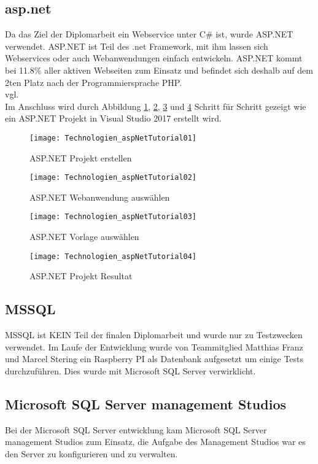 \subsection {asp.net}
\label{sec:asp.net}
Da das Ziel der Diplomarbeit ein Webservice unter C\# ist, wurde ASP.NET verwendet. ASP.NET ist Teil des .net Framework, mit ihm lassen sich Webservices oder auch Webanwendungen einfach entwickeln. ASP.NET kommt bei 11.8\% aller aktiven Webseiten zum Einsatz und befindet sich deshalb auf dem 2ten Platz nach der Programmiersprache PHP. \\vgl. \cite{aspnetstatistik}
\\ Im Anschluss wird durch Abbildung \ref{fig:aspNetTut01}, \ref{fig:aspNetTut02}, \ref{fig:aspNetTut03} und \ref{fig:aspNetTut04} Schritt für Schritt gezeigt wie ein ASP.NET Projekt in Visual Studio 2017 erstellt wird.
\begin{figure}[h]
    \texttt{[image: Technologien\_aspNetTutorial01]}
    \caption{ASP.NET Projekt erstellen}
    \label{fig:aspNetTut01}
\end{figure}
\begin{figure}[h]
    \texttt{[image: Technologien\_aspNetTutorial02]}
    \caption{ASP.NET Webanwendung auswählen}
    \label{fig:aspNetTut02}
\end{figure}
\begin{figure}[H]
    \texttt{[image: Technologien\_aspNetTutorial03]}
    \caption{ASP.NET Vorlage auswählen}
    \label{fig:aspNetTut03}
\end{figure}
\begin{figure}[h]
    \texttt{[image: Technologien\_aspNetTutorial04]}
    \caption{ASP.NET Projekt Resultat}
    \label{fig:aspNetTut04}
\end{figure}
\subsection {MSSQL}
\label{sec:MSSQL}
MSSQL ist KEIN Teil der finalen Diplomarbeit und wurde nur zu Testzwecken verwendet. Im Laufe der Entwicklung wurde von Teammitglied Matthias Franz und Marcel Stering ein Raspberry PI als Datenbank aufgesetzt um einige Tests durchzuführen. Dies wurde mit Microsoft SQL Server verwirklicht. 
\subsection {Microsoft SQL Server management Studios}
\label{sec:mssql-server-management-studio}
Bei der Microsoft SQL Server entwicklung kam Microsoft SQL Server management Studios zum Einsatz, die Aufgabe des Management Studios war es den Server zu konfigurieren und zu verwalten. 
